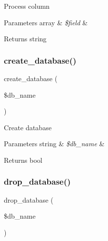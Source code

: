 Process column


\begin{DoxyParams}[1]{Parameters}
array & {\em \$field} & \\
\hline
\end{DoxyParams}
\begin{DoxyReturn}{Returns}
string 
\end{DoxyReturn}
\mbox{\label{class_c_i___d_b__sqlite3__forge_a902a7267babceb2ce595706f217e00ad}} 
\subsubsection{\texorpdfstring{create\+\_\+database()}{create\_database()}}
{\footnotesize\ttfamily create\+\_\+database (\begin{DoxyParamCaption}\item[{}]{\$db\+\_\+name }\end{DoxyParamCaption})}

Create database


\begin{DoxyParams}[1]{Parameters}
string & {\em \$db\+\_\+name} & \\
\hline
\end{DoxyParams}
\begin{DoxyReturn}{Returns}
bool 
\end{DoxyReturn}
\mbox{\label{class_c_i___d_b__sqlite3__forge_a9612987b2d4230de2638d15857e92e67}} 
\subsubsection{\texorpdfstring{drop\+\_\+database()}{drop\_database()}}
{\footnotesize\ttfamily drop\+\_\+database (\begin{DoxyParamCaption}\item[{}]{\$db\+\_\+name }\end{DoxyParamCaption})}

